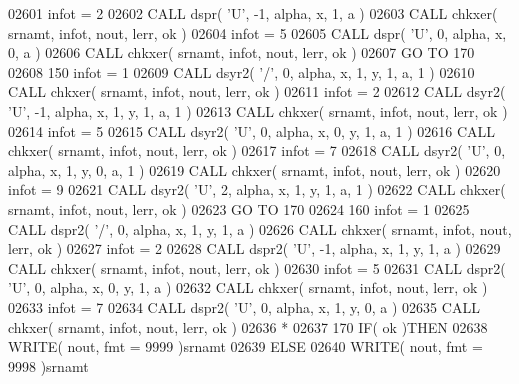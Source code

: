 \begin{DoxyCode}
02601       infot = 2
02602       \textcolor{keyword}{CALL }dspr( \textcolor{stringliteral}{'U'}, -1, alpha, x, 1, a )
02603       \textcolor{keyword}{CALL }chkxer( srnamt, infot, nout, lerr, ok )
02604       infot = 5
02605       \textcolor{keyword}{CALL }dspr( \textcolor{stringliteral}{'U'}, 0, alpha, x, 0, a )
02606       \textcolor{keyword}{CALL }chkxer( srnamt, infot, nout, lerr, ok )
02607       \textcolor{keywordflow}{GO TO} 170
02608   150 infot = 1
02609       \textcolor{keyword}{CALL }dsyr2( \textcolor{stringliteral}{'/'}, 0, alpha, x, 1, y, 1, a, 1 )
02610       \textcolor{keyword}{CALL }chkxer( srnamt, infot, nout, lerr, ok )
02611       infot = 2
02612       \textcolor{keyword}{CALL }dsyr2( \textcolor{stringliteral}{'U'}, -1, alpha, x, 1, y, 1, a, 1 )
02613       \textcolor{keyword}{CALL }chkxer( srnamt, infot, nout, lerr, ok )
02614       infot = 5
02615       \textcolor{keyword}{CALL }dsyr2( \textcolor{stringliteral}{'U'}, 0, alpha, x, 0, y, 1, a, 1 )
02616       \textcolor{keyword}{CALL }chkxer( srnamt, infot, nout, lerr, ok )
02617       infot = 7
02618       \textcolor{keyword}{CALL }dsyr2( \textcolor{stringliteral}{'U'}, 0, alpha, x, 1, y, 0, a, 1 )
02619       \textcolor{keyword}{CALL }chkxer( srnamt, infot, nout, lerr, ok )
02620       infot = 9
02621       \textcolor{keyword}{CALL }dsyr2( \textcolor{stringliteral}{'U'}, 2, alpha, x, 1, y, 1, a, 1 )
02622       \textcolor{keyword}{CALL }chkxer( srnamt, infot, nout, lerr, ok )
02623       \textcolor{keywordflow}{GO TO} 170
02624   160 infot = 1
02625       \textcolor{keyword}{CALL }dspr2( \textcolor{stringliteral}{'/'}, 0, alpha, x, 1, y, 1, a )
02626       \textcolor{keyword}{CALL }chkxer( srnamt, infot, nout, lerr, ok )
02627       infot = 2
02628       \textcolor{keyword}{CALL }dspr2( \textcolor{stringliteral}{'U'}, -1, alpha, x, 1, y, 1, a )
02629       \textcolor{keyword}{CALL }chkxer( srnamt, infot, nout, lerr, ok )
02630       infot = 5
02631       \textcolor{keyword}{CALL }dspr2( \textcolor{stringliteral}{'U'}, 0, alpha, x, 0, y, 1, a )
02632       \textcolor{keyword}{CALL }chkxer( srnamt, infot, nout, lerr, ok )
02633       infot = 7
02634       \textcolor{keyword}{CALL }dspr2( \textcolor{stringliteral}{'U'}, 0, alpha, x, 1, y, 0, a )
02635       \textcolor{keyword}{CALL }chkxer( srnamt, infot, nout, lerr, ok )
02636 \textcolor{comment}{*}
02637   170 \textcolor{keywordflow}{IF}( ok )\textcolor{keywordflow}{THEN}
02638          \textcolor{keyword}{WRITE}( nout, fmt = 9999 )srnamt
02639       \textcolor{keywordflow}{ELSE}
02640          \textcolor{keyword}{WRITE}( nout, fmt = 9998 )srnamt

\end{DoxyCode}
